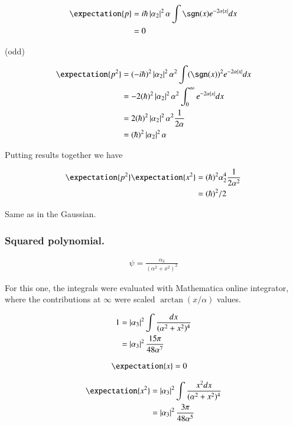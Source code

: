 \begin{align*}
\expectation{p} 
&= i \hbar \Abs{\alpha_2}^2 \alpha \int \sgn(x) e^{-2\alpha\Abs{x}} dx  \\
&= 0
\end{align*}

(odd)

\begin{align*}
\expectation{p^2} 
&= (-i \hbar)^2 \Abs{\alpha_2}^2 \alpha^2 \int (\sgn(x))^2 e^{-2\alpha\Abs{x}} dx  \\
&= - 2(\hbar)^2 \Abs{\alpha_2}^2 \alpha^2 \int_0^\infty e^{-2\alpha\Abs{x}} dx  \\
&= 2(\hbar)^2 \Abs{\alpha_2}^2 \alpha^2 \inv{2\alpha} \\
&= (\hbar)^2 \Abs{\alpha_2}^2 \alpha \\
\end{align*}

Putting results together we have

\begin{align*}
\expectation{p^2} \expectation{x^2} 
&= (\hbar)^2 \alpha_2^4 \inv{2 \alpha^2} \\
&= (\hbar)^2/2
\end{align*}

Same as in the Gaussian.

\subsubsection{Squared polynomial. }

\begin{align*}
\psi = \frac{\alpha_3}{(\alpha^2 + x^2)^2}
\end{align*}

For this one, the integrals were evaluated with Mathematica online integrator, where the contributions at $\infty$ were scaled $\arctan(x/\alpha)$ values.

\begin{align*}
1 
&= \left\lvert{\alpha_3}\right\rvert^2 \int \frac{dx}{(\alpha^2 + x^2)^4} \\
&= \left\lvert{\alpha_3}\right\rvert^2 \frac{15 \pi}{48 \alpha^7}
\end{align*}

\begin{align*}
\expectation{x} &= 0
\end{align*}

\begin{align*}
\expectation{x^2} 
&= \Abs{\alpha_3}^2 \int \frac{x^2 dx}{(\alpha^2 + x^2)^4} \\
&= \Abs{\alpha_3}^2 \frac{3 \pi}{48 \alpha^5}
\end{align*}

